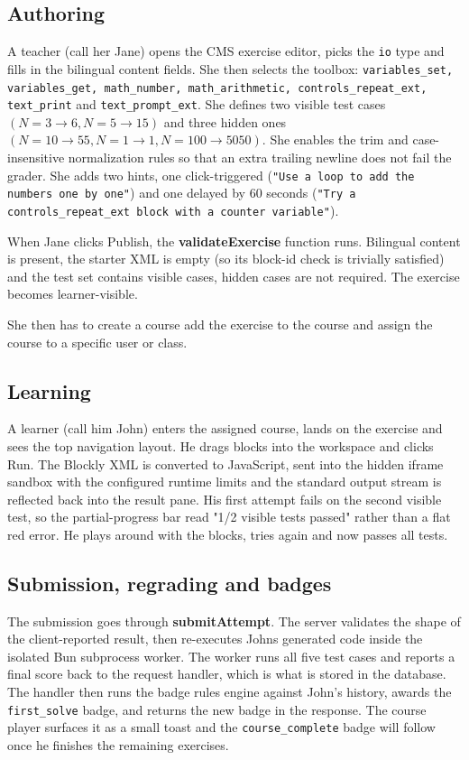 \subsection*{Authoring}
A teacher (call her Jane) opens the CMS exercise editor, picks the \texttt{io} type and fills in the bilingual content fields.
She then selects the toolbox: \texttt{variables\_set, variables\_get, math\_number, math\_arithmetic, controls\_repeat\_ext, 
text\_print} and \texttt{text\_prompt\_ext}. She defines two visible test cases $(N = 3 \rightarrow 6, N = 5 \rightarrow 15)$ 
and three hidden ones $(N = 10 \rightarrow 55, N = 1 \rightarrow 1, N = 100 \rightarrow 5050)$.
She enables the trim and case-insensitive normalization rules so that an extra trailing newline does not fail the grader.
She adds two hints, one click-triggered (\texttt{"Use a loop to add the numbers one by one"}) and one delayed by 
60 seconds (\texttt{"Try a controls\_repeat\_ext block with a counter variable"}).

When Jane clicks Publish, the \textbf{validateExercise} function runs. Bilingual content is present, the starter XML is 
empty (so its block-id check is trivially satisfied) and the test set contains visible cases, hidden cases are not required.
The exercise becomes learner-visible.

She then has to create a course add the exercise to the course and assign the course to a specific user or class.

\subsection*{Learning}
A learner (call him John) enters the assigned course, lands on the exercise and sees the top navigation layout. 
He drags blocks into the workspace and clicks Run. The Blockly XML is converted to JavaScript, sent into the hidden 
iframe sandbox with the configured runtime limits and the standard output stream is reflected back into the result pane. 
His first attempt fails on the second visible test, so the partial-progress bar read "1/2 visible tests passed" 
rather than a flat red error.
He plays around with the blocks, tries again and now passes all tests.


\subsection*{Submission, regrading and badges}
The submission goes through \textbf{submitAttempt}. The server validates the shape of the client-reported result, 
then re-executes Johns generated code inside the isolated Bun subprocess worker.
The worker runs all five test cases and reports a final score back to the request handler, which is what is 
stored in the database. The handler then runs the badge rules engine against John's history, awards the \texttt{first\_solve} 
badge, and returns the new badge in the response. The course player surfaces it as a small toast and the 
\texttt{course\_complete} badge will follow once he finishes the remaining exercises.

